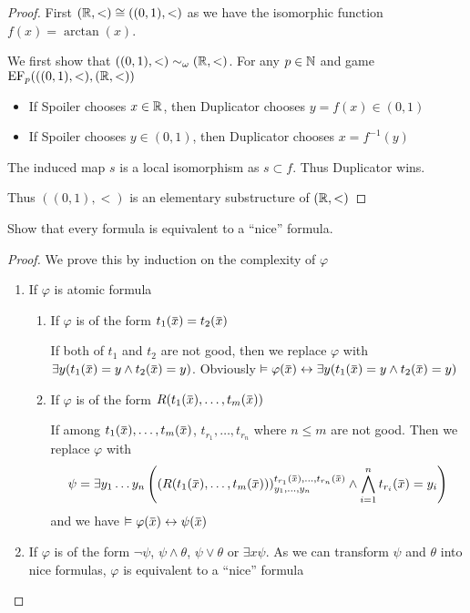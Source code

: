 \documentclass[11pt]{article}
\def \EF {\text{EF}}
\begin{document}
\begin{proof}
First \((\mathbb{R},<)\cong((0,1),<)\) as we have the isomorphic function \(f(x)=\arctan(x)\).

We first show that \(((0,1),<)\sim_\omega(\mathbb{R},<)\). For any \(p\in\mathbb{N}\) and game \(\EF_p(((0,1),<),(\R,<))\)
\begin{itemize}
\item If Spoiler chooses \(x\in\mathbb{R}\), then Duplicator chooses \(y=f(x)\in(0,1)\)
\item If Spoiler chooses \(y\in(0,1)\), then Duplicator chooses \(x=f^{-1}(y)\)
\end{itemize}
The induced map \(s\) is a local isomorphism as \(s\subset f\). Thus Duplicator wins.

Thus \(((0,1),<)\) is an elementary substructure of \((\mathbb{R},<)\)
\end{proof}

\begin{exercise}
Show that every formula is equivalent to a ``nice'' formula.
\end{exercise}

\begin{proof}
We prove this by induction on the complexity of \(\varphi\)
\begin{enumerate}
\item If \(\varphi\) is atomic formula
\begin{enumerate}
\item If \(\varphi\) is of the form \(t_1(\barx)=t_2(\barx)\)

If both of \(t_1\) and \(t_2\) are not good, then we replace \(\varphi\)
with \(\exists y(t_1(\barx)=y\wedge t_2(\barx)=y)\).
Obviously \(\vDash \varphi(\barx)\leftrightarrow\exists y(t_1(\barx)=y\wedge t_2(\barx)=y)\)
\item If \(\varphi\) is of the form \(R(t_1(\barx),\dots,t_m(\barx))\)

If among \(t_1(\barx),\dots,t_m(\barx)\), \(t_{r_1},\dots,t_{r_n}\) where \(n\le m\) are not good. Then we
replace \(\varphi\) with
\begin{equation*}
\psi=\exists y_1\dots y_{n}\left( \left(R(t_1(\barx),\dots,t_m(\barx))\right)^{t_{r_1}(\barx),\dots,t_{r_n}(\barx)}_{y_1,\dots,y_n}\wedge
\bigwedge_{i=1}^nt_{r_i}(\barx)=y_i\right)
\end{equation*}
and we have \(\vDash\varphi(\barx)\leftrightarrow\psi(\barx)\)
\end{enumerate}
\item If \(\varphi\) is of the form \(\neg\psi\), \(\psi\wedge\theta\), \(\psi\vee\theta\) or \(\exists x\psi\). As we can transform \(\psi\) and \(\theta\) into nice
formulas, \(\varphi\) is equivalent to a ``nice'' formula
\end{enumerate}
\end{proof}
\end{document}
